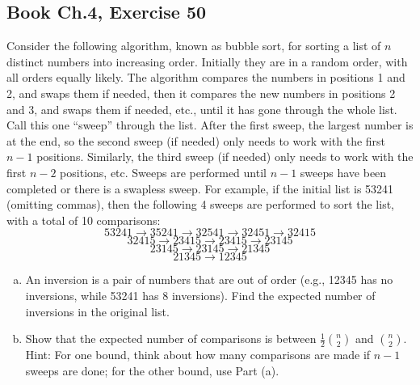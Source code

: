 \documentclass[11pt,a4paper]{article}
\begin{document}
\vspace{10pt}
\subsection{Book Ch.4, Exercise 50}
\begin{tcolorbox}[title={Book Ch.4, Exercise 50}]
Consider the following algorithm, known as bubble sort, for sorting a list of $n$ distinct numbers into increasing order. Initially they are in a random order, with all orders equally likely. The algorithm compares the numbers in positions 1 and 2, and swaps them if needed, then it compares the new numbers in positions 2 and 3, and swaps them if needed, etc., until it has gone through the whole list. Call this one ``sweep'' through the list. After the first sweep, the largest number is at the end, so the second sweep (if needed) only needs to work with the first $n-1$ positions. Similarly, the third sweep (if needed) only needs to work with the first $n-2$ positions, etc. Sweeps are performed until $n-1$ sweeps have been completed or there is a swapless sweep.
For example, if the initial list is 53241 (omitting commas), then the following 4 sweeps are performed to sort the list, with a total of 10 comparisons:
\[
53241 \rightarrow 35241 \rightarrow 32541 \rightarrow 32451 \rightarrow 32415
\]
\[
32415 \rightarrow 23415 \rightarrow 23415 \rightarrow 23145
\]
\[
23145 \rightarrow 23145 \rightarrow 21345
\]
\[
21345 \rightarrow 12345
\]
\begin{enumerate}[(a)]
\item An inversion is a pair of numbers that are out of order (e.g., 12345 has no inversions, while 53241 has 8 inversions). Find the expected number of inversions in the original list.
\item Show that the expected number of comparisons is between $\frac{1}{2}\binom{n}{2}$ and $\binom{n}{2}$.
Hint: For one bound, think about how many comparisons are made if $n-1$ sweeps are done; for the other bound, use Part (a).
\end{enumerate}
\end{tcolorbox}
\end{document}
